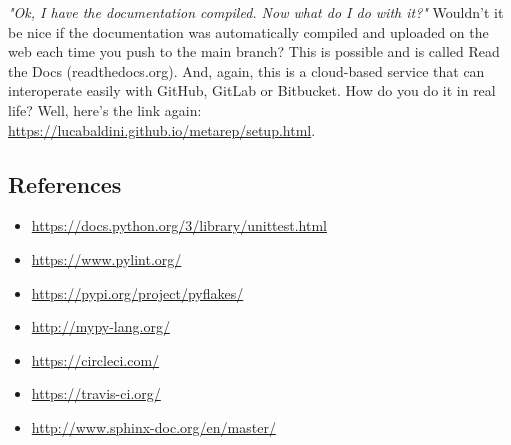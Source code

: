 \textit{"Ok, I have the documentation compiled. Now what do I do with it?"}
Wouldn't it be nice if the documentation was automatically compiled and uploaded on the web each time you push to the main branch? This is possible and is called Read the Docs (readthedocs.org). And, again, this is a cloud-based service that can interoperate easily with GitHub, GitLab or Bitbucket. How do you do it in real life? Well, here's the link again: \\ \url{https://lucabaldini.github.io/metarep/setup.html}.

\subsection{References}
\begin{itemize}
    \item[-] \url{https://docs.python.org/3/library/unittest.html}
    \item[-] \url{https://www.pylint.org/}
    \item[-] \url{https://pypi.org/project/pyflakes/}
    \item[-] \url{http://mypy-lang.org/}
    \item[-] \url{https://circleci.com/}
    \item[-] \url{https://travis-ci.org/}
    \item[-] \url{http://www.sphinx-doc.org/en/master/}
\end{itemize}